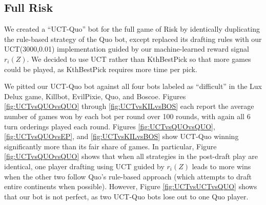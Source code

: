 \documentclass[letterpaper]{article}
\numberwithin{equation}{section}
\numberwithin{theorem}{section}
\numberwithin{lemma}{section}
\numberwithin{df}{section}
\begin{document}


\subsection{Full Risk}


We created a ``UCT-Quo'' bot for the full game of Risk by identically duplicating the rule-based strategy of the Quo bot, except replaced its drafting rules with our UCT(3000,0.01) implementation guided by our machine-learned reward signal $r_i(Z)$.  We decided to use UCT rather than KthBestPick so that more games could be played, as KthBestPick requires more time per pick.  

We pitted our UCT-Quo bot against all four bots labeled as ``difficult'' in the Lux Delux game, Killbot, EvilPixie, Quo, and Boscoe.  Figures \ref{fig:UCTvsQUOvsQUO} through \ref{fig:UCTvsKILvsBOS} each report the average number of games won by each bot per round over 100 rounds, with again all 6 turn orderings played each round.  Figures \ref{fig:UCTvsQUOvsQUO}, \ref{fig:UCTvsQUOvsEP}, and \ref{fig:UCTvsKILvsBOS} show UCT-Quo winning significantly more than its fair share of games.  In particular, Figure \ref{fig:UCTvsQUOvsQUO} shows that when all strategies in the post-draft play are identical, one player drafting using UCT guided by $r_i(Z)$ leads to more wins when the other two follow Quo's rule-based approach (which attempts to draft entire continents when possible).  However, Figure \ref{fig:UCTvsUCTvsQUO} shows that our bot is not perfect, as two UCT-Quo bots lose out to one Quo player.  

\end{document}
